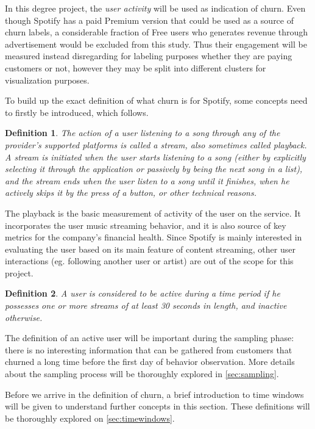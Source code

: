 \documentclass{kththesis}
\begin{document}
In this degree project, the \emph{user activity} will be used as indication of churn. Even though Spotify has a paid Premium version that could be used as a source of churn labels, a considerable fraction of Free users who generates revenue through advertisement would be excluded from this study. Thus their engagement will be measured instead disregarding for labeling purposes whether they are paying customers or not, however they may be split into different clusters for visualization purposes.

To build up the exact definition of what churn is for Spotify, some concepts need to firstly be introduced, which follows.

\newtheorem{definition}{Definition}

\begin{definition}
The action of a user listening to a song through any of the provider's supported platforms is called a \emph{stream}, also sometimes called \emph{playback}. A stream is initiated when the user starts listening to a song (either by explicitly selecting it through the application or passively by being the next song in a list), and the stream ends when the user listen to a song until it finishes, when he actively skips it by the press of a button, or other technical reasons.
\end{definition}

The playback is the basic measurement of activity of the user on the service. It incorporates the user music streaming behavior, and it is also source of key metrics for the company's financial health. Since Spotify is mainly interested in evaluating the user based on its main feature of content streaming, other user interactions (eg. following another user or artist) are out of the scope for this project. 

\begin{definition}
A user is considered to be \emph{active} during a time period if he possesses one or more streams of at least 30 seconds in length, and \emph{inactive} otherwise.
\end{definition}

The definition of an active user will be important during the sampling phase: there is no interesting information that can be gathered from customers that churned a long time before the first day of behavior observation. More details about the sampling process will be thoroughly explored in \autoref{sec:sampling}.

Before we arrive in the definition of churn, a brief introduction to time windows will be given to understand further concepts in this section. These definitions will be thoroughly explored on \autoref{sec:timewindows}.
\end{document}
